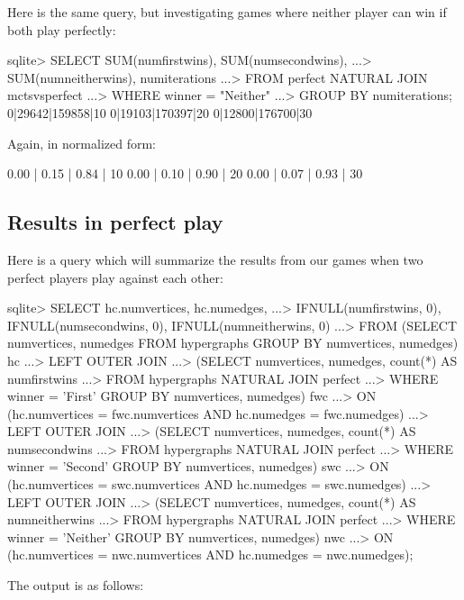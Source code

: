Here is the same query, but investigating games where neither player can win if both play perfectly:

\begin{code}
sqlite> SELECT SUM(numfirstwins), SUM(numsecondwins),
   ...> SUM(numneitherwins), numiterations
   ...> FROM perfect NATURAL JOIN mctsvsperfect
   ...> WHERE winner = "Neither"
   ...> GROUP BY numiterations;
0|29642|159858|10
0|19103|170397|20
0|12800|176700|30
\end{code}

Again, in normalized form:

\begin{code}
0.00 | 0.15 | 0.84 | 10
0.00 | 0.10 | 0.90 | 20
0.00 | 0.07 | 0.93 | 30
\end{code}

\subsection{Results in perfect play}

Here is a query which will summarize the results from our games when two perfect players play against each other:

\begin{datalisting}
sqlite> SELECT hc.numvertices, hc.numedges,
   ...> IFNULL(numfirstwins, 0), IFNULL(numsecondwins, 0), IFNULL(numneitherwins, 0)
   ...> FROM (SELECT numvertices, numedges FROM hypergraphs GROUP BY numvertices, numedges) hc
   ...> LEFT OUTER JOIN
   ...>   (SELECT numvertices, numedges, count(*) AS numfirstwins
   ...>    FROM hypergraphs NATURAL JOIN perfect
   ...>    WHERE winner = 'First' GROUP BY numvertices, numedges) fwc
   ...> ON (hc.numvertices = fwc.numvertices AND hc.numedges = fwc.numedges)
   ...> LEFT OUTER JOIN
   ...>   (SELECT numvertices, numedges, count(*) AS numsecondwins
   ...>    FROM hypergraphs NATURAL JOIN perfect
   ...>    WHERE winner = 'Second' GROUP BY numvertices, numedges) swc
   ...> ON (hc.numvertices = swc.numvertices AND hc.numedges = swc.numedges)
   ...> LEFT OUTER JOIN
   ...>   (SELECT numvertices, numedges, count(*) AS numneitherwins
   ...>    FROM hypergraphs NATURAL JOIN perfect
   ...>    WHERE winner = 'Neither' GROUP BY numvertices, numedges) nwc
   ...> ON (hc.numvertices = nwc.numvertices AND hc.numedges = nwc.numedges);
\end{datalisting}
The output is as follows:

